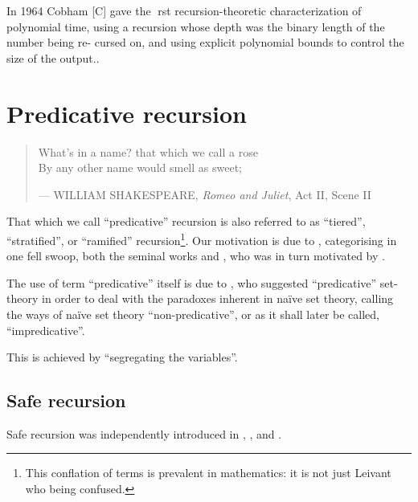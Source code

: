 In 1964 Cobham [C] gave the rst recursion-theoretic characterization of
polynomial time, using a recursion whose depth was the binary length of the
number being re- cursed on, and using explicit polynomial bounds to control the
size of the output.\cite{bellantoni-phd-1992}.

\section{Predicative recursion}

\begin{quotation}

\footnotesize\sffamily\itshape

\begin{flushright}

What's in a name? that which we call a rose \\
By any other name would smell as sweet;

\smallbreak

\upshape

--- WILLIAM SHAKESPEARE, \emph{Romeo and Juliet}, Act II, Scene II

\end{flushright}

\end{quotation}

That which we call ``predicative'' recursion is also referred to as
``tiered''\cite{leivant-1990}, ``stratified''\cite{leivant-1993}, or
``ramified''\cite{leivant-1995} recursion\footnote{This conflation of terms is
prevalent in mathematics: it is not just Leivant who being confused.}. Our
motivation is due to \cite{hofmann-2000a}, categorising in one fell swoop, both
the seminal works \cite{bellantoni-cook-1992} and \cite{leivant-1995}, who was
in turn motivated by \cite{bellantoni-phd-1992}.

The use of term ``predicative'' itself is due to \cite{russel-1907}, who
suggested ``predicative'' set-theory in order to deal with the paradoxes
inherent in na\"ive set theory, calling the ways of na\"ive set theory
``non-predicative'', or as it shall later be called, ``impredicative''.

This is achieved by ``segregating the variables''.


\subsection{Safe recursion}

Safe recursion was independently introduced in \cite{simmons-1988},
\cite{leivant-1990}, and \cite{bellantoni-cook-1992}.

